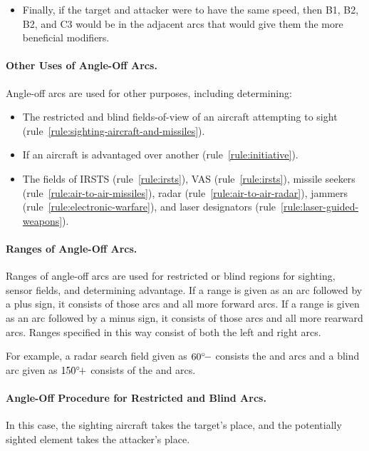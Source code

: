 {\begin{itemize}
\item
Finally, if the target and attacker were to have the same speed, then B1, B2, B2, and C3 would be in the adjacent arcs that would give them the more beneficial modifiers. 

\end{itemize}

\paragraph{Other Uses of Angle-Off Arcs.}
Angle-off arcs are used for other purposes, including determining:
\begin{itemize}
    \item The restricted and blind fields-of-view of an aircraft attempting to sight (rule~\ref{rule:sighting-aircraft-and-missiles}).
    \item If an aircraft is advantaged over another (rule~\ref{rule:initiative}).
    \item The fields of IRSTS (rule~\ref{rule:irsts}), VAS (rule~\ref{rule:irsts}), missile seekers (rule~\ref{rule:air-to-air-missiles}), radar (rule~\ref{rule:air-to-air-radar}), jammers (rule~\ref{rule:electronic-warfare}), and laser designators (rule~\ref{rule:laser-guided-weapons}).
\end{itemize}

\paragraph{Ranges of Angle-Off Arcs.} Ranges of angle-off arcs are used for restricted or blind regions for sighting, sensor fields, and determining advantage. If a range is given as an arc followed by a plus sign, it consists of those arcs and all more forward arcs. If a range is given as an arc followed by a minus sign, it consists of those arcs and all more rearward arcs. Ranges specified in this way consist of both the left and right arcs.

For example, a radar search field given as $\mbox{$60{^\circ}\!-$}$ consists the  and  arcs and a blind arc given as $\mbox{$150{^\circ}\!+$}$ consists of the  and  arcs. 

\paragraph{Angle-Off Procedure for Restricted and Blind Arcs.}
In this case, the sighting aircraft takes the target's place, and the potentially sighted element takes the attacker's place. 

}
